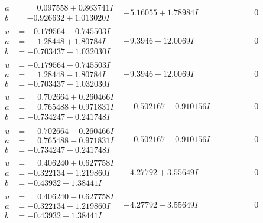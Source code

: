 \documentclass[1p]{elsarticle_modified}
\theoremstyle{definition}
\begin{document}
$$\begin{array}{c|c|c}
\begin{aligned}
a &= \phantom{-}0.097558 + 0.863741 I \\
b &= -0.926632 + 1.013020 I\end{aligned}
 & -5.16055 + 1.78984 I & \phantom{-0.000000 } 0 \\ \hline\begin{aligned}
u &= -0.179564 + 0.745503 I \\
a &= \phantom{-}1.28448 + 1.80784 I \\
b &= -0.703437 + 1.032030 I\end{aligned}
 & -9.3946 - 12.0069 I & \phantom{-0.000000 } 0 \\ \hline\begin{aligned}
u &= -0.179564 - 0.745503 I \\
a &= \phantom{-}1.28448 - 1.80784 I \\
b &= -0.703437 - 1.032030 I\end{aligned}
 & -9.3946 + 12.0069 I & \phantom{-0.000000 } 0 \\ \hline\begin{aligned}
u &= \phantom{-}0.702664 + 0.260466 I \\
a &= \phantom{-}0.765488 + 0.971831 I \\
b &= -0.734247 + 0.241748 I\end{aligned}
 & \phantom{-}0.502167 + 0.910156 I & \phantom{-0.000000 } 0 \\ \hline\begin{aligned}
u &= \phantom{-}0.702664 - 0.260466 I \\
a &= \phantom{-}0.765488 - 0.971831 I \\
b &= -0.734247 - 0.241748 I\end{aligned}
 & \phantom{-}0.502167 - 0.910156 I & \phantom{-0.000000 } 0 \\ \hline\begin{aligned}
u &= \phantom{-}0.406240 + 0.627758 I \\
a &= -0.322134 + 1.219860 I \\
b &= -0.43932 + 1.38441 I\end{aligned}
 & -4.27792 + 3.55649 I & \phantom{-0.000000 } 0 \\ \hline\begin{aligned}
u &= \phantom{-}0.406240 - 0.627758 I \\
a &= -0.322134 - 1.219860 I \\
b &= -0.43932 - 1.38441 I\end{aligned}
 & -4.27792 - 3.55649 I & \phantom{-0.000000 } 0 \\ \hline\begin{aligned}

\end{aligned}
\end{array}$$
\end{document}
